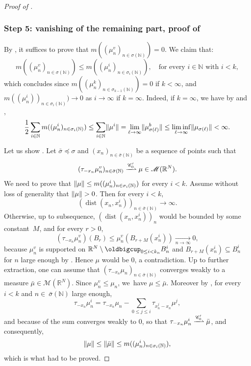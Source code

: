 \documentclass[JEP,XML,SOM,Unicode,published]{cedram}
\theoremstyle{plain}
\theoremstyle{definition}
\newcommand{\N}{\mathbb{N}}
\newcommand{\R}{\mathbb{R}}
\newcommand{\Cspace}{\mathscr{C}}
\newcommand{\Mspace}{\mathscr{M}}
\DeclarePairedDelimiter{\norm}{\lVert}{\rVert}
\DeclareMathOperator{\dist}{dist}
\newcommand{\mweakto}{\xrightharpoonup{\Cspace_0'}}
\newcommand{\xto}[2][]{\xrightarrow[#2]{#1}}
\begin{document}
\begin{proof}[Proof of ]
\subsubsection*{Step 5: vanishing of the remaining part, proof of }
By , it suffices to prove that \(m((\mu^v_n)_{n\in\sigma(\N)})=0\). We claim that:
\begin{equation}\label{bubbleConcentrationEstimate}
m((\mu^v_n)_{n\in\sigma(\N)})\le m((\mu^i_n)_{n\in\sigma_i(\N)}),\quad\text{for every \(i\in\N\) with \(i< k\)},
\end{equation}
which concludes since \(m((\mu^k_n)_{n\in\sigma_{k-1}(\N)})=0\) if \(k<\infty\), and \(m((\mu^i_n))_{n\in\sigma_i(\N)})\to 0\) as \(i\to\infty\) if \(k=\infty\). Indeed, if \(k=\infty\), we have by  and ,
\[
\frac 12\sum_{i\in\N}m((\mu^i_n)_{n\in\sigma_i(\N)})\le\sum_{i\in\N}\norm{\mu^i}= \lim_{\ell\to\infty} \norm{\mu_{\sigma(\ell)}^b} \leq \liminf_{\ell\to\infty}\norm{\mu_{\sigma(\ell)}}<\infty.
\]

Let us show . Let \(\bar\sigma\preceq\sigma\) and \((x_n)_{n\in\bar\sigma(\N)}\) be a sequence of points such that
\[
(\tau_{-x_n}\mu^v_n)_{n\in\bar\sigma(\N)}\mweakto \mu\in\Mspace(\R^N).
\]
We need to prove that \(\norm{\mu}\le m((\mu^i_n)_{n\in \sigma_i(\N)})\) for every $i <k$. Assume without loss of generality that \(\norm{\mu}>0\). Then for every \(i<k\),
\begin{equation}\label{distanceDiverge}
(\dist(x_n,x^i_n))_{n\in\bar\sigma(\N)}\to\infty.
\end{equation}
Otherwise, up to subsequence, $(\dist(x_n,x_n^i))_n$ would be bounded by some constant~$M$, and for every $r > 0$,
\[(\tau_{-x_n} \mu_n^v)(B_r) \leq \mu_n^v(B_{r+M}(x^i_n)) \xto{n\to\infty} 0,\]
because \(\mu^v_n\) is supported on \(\R^N\setminus\oldbigcup_{0\le i<k_n}B^i_n\) and $B_{r+M}(x^i_n) \subseteq B^i_n$ for $n$ large enough by . Hence \(\mu\) would be \(0\), a contradiction. Up to further extraction, one can assume that \((\tau_{-x_n}\mu_n)_{n\in\bar\sigma(\N)}\) converges weakly to a measure \(\bar\mu \in \Mspace(\R^N)\). Since \(\mu^v_n\le\mu_n\), we~have \(\mu\le\bar\mu\). Moreover by , for every \(i < k\) and \(n\in\ \bar\sigma(\N)\) large enough,
\[
\tau_{-x_n}\mu^i_n=\tau_{-x_n}\mu_n-\sum_{0\le j\leq i}\tau_{x^j_n-x_n}\mu^j,
\]
and because of  the sum converges weakly to $0$, so that $\tau_{-x_n} \mu_n^i \mweakto \bar \mu$, and consequently,
\[
\norm{\mu}\le\norm{\bar\mu}\le m((\mu^i_n)_{n\in\sigma_i(\N)}),
\]
which is what had to be proved.


\end{proof}
\end{document}
